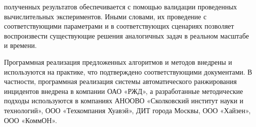 {\reliability} полученных результатов обеспечивается с помощью валидации проведенных вычислительных экспериментов. Иными словами, их проведение с соответствующими параметрами и в соответствующих сценариях позволяет воспроизвести существующие решения аналогичных задач в реальном масштабе и времени.




Программная реализация предложенных алгоритмов и методов внедрены  и используются на практике, что подтверждено соответствующими документами. В частности, программная реализация системы автоматического ранжирования инцидентов внедрена в компании ОАО «РЖД», а разработанные методические подходы используются в компаниях АНООВО «Сколковский институт науки и технологий», ООО «Техкомпания Хуавэй», ДИТ города Москвы, ООО «Хайзен», ООО «КоммОН».

